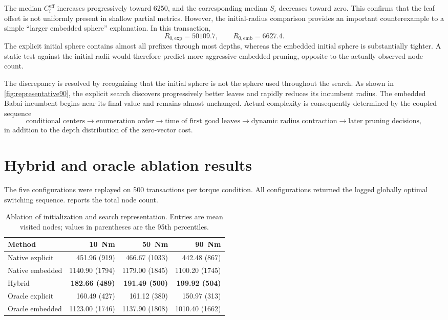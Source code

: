 \documentclass[paper=a4,oneside,fontsize=12pt,DIV=14,headings=normal,parskip=half,headsepline,numbers=noendperiod]{scrreprt}
\begin{document}
The median $C_i^{\mathrm{eff}}$ increases progressively toward 6250, and the
corresponding median $S_i$ decreases toward zero.  This confirms that the leaf
offset is not uniformly present in shallow partial metrics.  However, the
initial-radius comparison provides an important counterexample to a simple
``larger embedded sphere'' explanation.  In this transaction,
\begin{equation}
 R_{0,\mathrm{exp}}=50109.7,
 \qquad
 R_{0,\mathrm{emb}}=6627.4.
\end{equation}
The explicit initial sphere contains almost all prefixes through most depths,
whereas the embedded initial sphere is substantially tighter.  A static test
against the initial radii would therefore predict more aggressive embedded
pruning, opposite to the actually observed node count.

The discrepancy is resolved by recognizing that the initial sphere is not the
sphere used throughout the search.  As shown in
\cref{fig:representative90}, the explicit search discovers progressively
better leaves and rapidly reduces its incumbent radius.  The embedded Babai
incumbent begins near its final value and remains almost unchanged.  Actual
complexity is consequently determined by the coupled sequence
\begin{equation}
 \text{conditional centers}
 \rightarrow
 \text{enumeration order}
 \rightarrow
 \text{time of first good leaves}
 \rightarrow
 \text{dynamic radius contraction}
 \rightarrow
 \text{later pruning decisions},
\end{equation}
in addition to the depth distribution of the zero-vector cost.

\section{Hybrid and oracle ablation results}
The five configurations were replayed on 500 transactions per torque
condition.  All configurations returned the logged globally optimal switching
sequence.   reports the total node count.

\begin{table}[H]
 \centering
 \caption{Ablation of initialization and search representation.  Entries are
 mean visited nodes; values in parentheses are the 95th percentiles.}
 \label{tab:hybrid_nodes}
 \begin{tabular}{lrrr}
 \toprule
 Method & 10~Nm & 50~Nm & 90~Nm\\
 \midrule
 Native explicit & 451.96 (919) & 466.67 (1033) & 442.48 (867)\\
 Native embedded & 1140.90 (1794) & 1179.00 (1845) & 1100.20 (1745)\\
 Hybrid & \textbf{182.66 (489)} & \textbf{191.49 (500)} & \textbf{199.92 (504)}\\
 Oracle explicit & 160.49 (427) & 161.12 (380) & 150.97 (313)\\
 Oracle embedded & 1123.00 (1746) & 1137.90 (1808) & 1010.40 (1662)\\
 \bottomrule
 \end{tabular}
\end{table}
\end{document}
